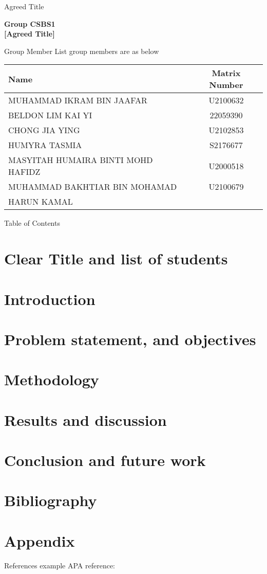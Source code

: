 \documentclass{beamer}
\begin{document}
\begin{frame}{Agreed Title}
\begin{center}
{\LARGE \textbf{Group CSBS1}} \\[1cm]
{\LARGE \textbf{[Agreed Title]}}
\end{center}
\end{frame}

\begin{frame}{Group Member List}
group members are as below
\begin{table}
\begin{center}
\small
    \begin{tabular}{|l|c|}
        \hline
        \textbf{Name} & \textbf{Matrix Number} \\ \hline
        MUHAMMAD IKRAM BIN JAAFAR  & U2100632  \\ \hline
        BELDON LIM KAI YI  & 22059390  \\ \hline
        CHONG JIA YING  & U2102853  \\ \hline
        HUMYRA TASMIA  & S2176677  \\ \hline
        MASYITAH HUMAIRA BINTI MOHD HAFIDZ  & U2000518  \\ \hline
        MUHAMMAD BAKHTIAR BIN MOHAMAD  & U2100679 \\
        HARUN KAMAL  &  \\ \hline
    \end{tabular}
\end{center}
\end{table}
\end{frame}

\begin{frame}{Table of Contents}
\tableofcontents
\end{frame}

\section{Clear Title and list of students}
\section{Introduction}
\section{Problem statement, and objectives}
\section{Methodology}
\section{Results and discussion}
\section{Conclusion and future work}
\section{Bibliography}
\section{Appendix}

\begin{frame}{References}
example APA reference: \\ 
\footnotesize
\cite{SAKA201325}


\end{frame}
\end{document}
